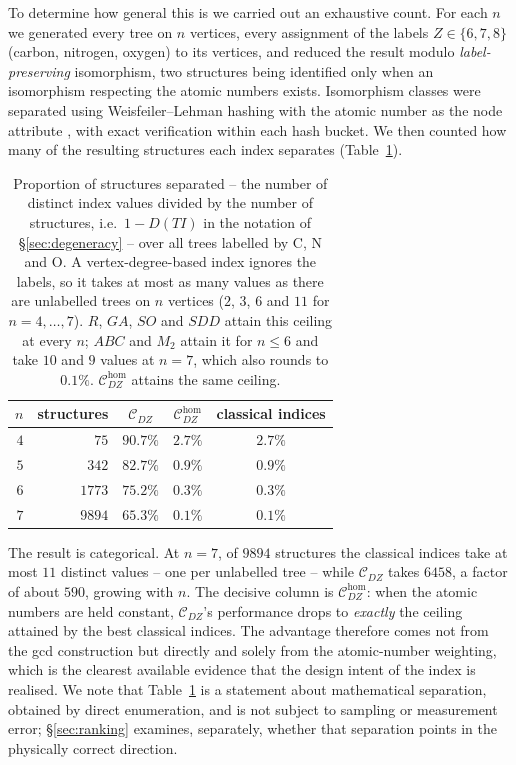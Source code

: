 \documentclass[11pt,a4paper]{article}
\theoremstyle{plain}
\theoremstyle{definition}
\theoremstyle{remark}
\newcommand{\CDZ}{\mathcal{C}_{DZ}}
\newcommand{\CDZhom}{\mathcal{C}_{DZ}^{\mathrm{hom}}}
\begin{document}
To determine how general this is we carried out an exhaustive count. For each
$n$ we generated every tree on $n$ vertices, every assignment of the labels
$Z\in\{6,7,8\}$ (carbon, nitrogen, oxygen) to its vertices, and reduced the
result modulo \emph{label-preserving} isomorphism, two structures being
identified only when an isomorphism respecting the atomic numbers exists.
Isomorphism classes were separated using Weisfeiler--Lehman hashing with the
atomic number as the node attribute \cite{shervashidze2011}, with exact
verification within each hash bucket. We then counted how many of the resulting
structures each index separates (Table~\ref{tab:labelled}).

\begin{table}[htbp]
\centering
\caption{Proportion of structures separated -- the number of distinct index
values divided by the number of structures, i.e.\ $1-D(TI)$ in the notation of
\S\ref{sec:degeneracy} -- over all trees labelled by C, N and O. A
vertex-degree-based index ignores the labels, so it takes at most as many
values as there are unlabelled trees on $n$ vertices ($2$, $3$, $6$ and $11$ for
$n=4,\dots,7$). $R$, $GA$, $SO$ and $SDD$ attain this ceiling at every $n$; $ABC$
and $M_2$ attain it for $n\le6$ and take $10$ and $9$ values at $n=7$, which
also rounds to $0.1\%$. $\CDZhom$ attains the same ceiling.}
\label{tab:labelled}
\begin{tabular}{rrccc}
\toprule
$n$ & structures & $\CDZ$ & $\CDZhom$ & classical indices \\
\midrule
$4$ & $75$   & $\mathbf{90.7\%}$ & $2.7\%$ & $2.7\%$ \\
$5$ & $342$  & $\mathbf{82.7\%}$ & $0.9\%$ & $0.9\%$ \\
$6$ & $1773$ & $\mathbf{75.2\%}$ & $0.3\%$ & $0.3\%$ \\
$7$ & $9894$ & $\mathbf{65.3\%}$ & $0.1\%$ & $0.1\%$ \\
\bottomrule
\end{tabular}
\end{table}

The result is categorical. At $n=7$, of $9894$ structures the classical indices
take at most $11$ distinct values -- one per unlabelled tree -- while $\CDZ$
takes $6458$, a factor of about $590$, growing with $n$. The decisive column is
$\CDZhom$: when the atomic numbers are held constant, $\CDZ$'s performance drops
to \emph{exactly} the ceiling attained by the best classical indices. The
advantage therefore comes not from the gcd construction but directly and solely
from the atomic-number weighting, which is the clearest available evidence that
the design intent of the index is realised. We note that
Table~\ref{tab:labelled} is a statement about mathematical separation, obtained
by direct enumeration, and is not subject to sampling or measurement error;
\S\ref{sec:ranking} examines, separately, whether that separation points in the
physically correct direction.
\end{document}
